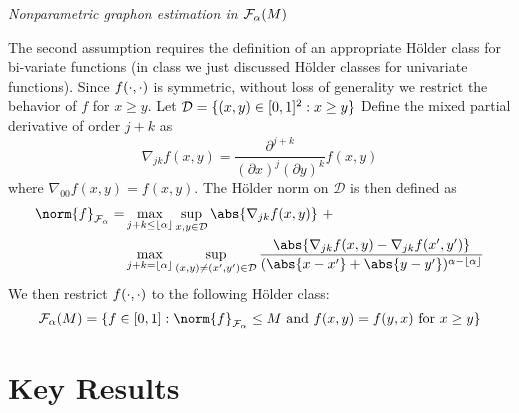 \documentclass[11pt]{article}
\begin{document}
\begin{assump}\label{assump:holder}
\textit{Nonparametric graphon estimation in $\mathcal{F}_{\alpha}(M)$}

\noindent
The second assumption requires the definition of an appropriate H\"older class for bi-variate functions (in class we just discussed H\"older classes for univariate functions). Since $f(\cdot, \cdot)$ is symmetric, without loss of generality we restrict the behavior of $f$ for $x \geq y$. Let $\mathcal{D} = \{(x, y) \in [0, 1]^2 : x \geq y\}$ Define the mixed partial derivative of order $j + k$ as
\begin{equation}
\nabla_{jk} f(x, y) = \frac{\partial^{j+k}}{(\partial x)^j (\partial y)^k}f(x, y)
\end{equation}
where $\nabla_{00} f(x, y) = f(x, y)$. The H\"older norm on $\mathcal{D}$ is then defined as
\begin{equation}
\begin{aligned}
\norm{f}_{\mathcal{F}_{\alpha}} = &\max_{j + k \leq \floor{\alpha}} \sup_{x,y \in \mathcal{D}} \abs{\nabla_{jk}f(x, y)} \ + \\
& \max_{j + k = \floor{\alpha}} \sup_{(x, y) \neq (x', y') \in \mathcal{D}}
\frac{\abs{\nabla_{jk}f(x,y) - \nabla_{jk}f(x', y')}}{(\abs{x - x'} + \abs{y -y'})^{\alpha - \floor{\alpha}}}
\end{aligned}
\end{equation}
We then restrict $f(\cdot, \cdot)$ to the following H\"older class:
\begin{equation}
\holder = \set{f \in [0, 1] : \norm{f}_{\mathcal{F}_{\alpha}} \leq M \text{ and } f(x, y) = f(y, x) \text{ for } x \geq y}
\end{equation}
\end{assump}



\section{Key Results} \label{sec:key_results}
\end{document}
